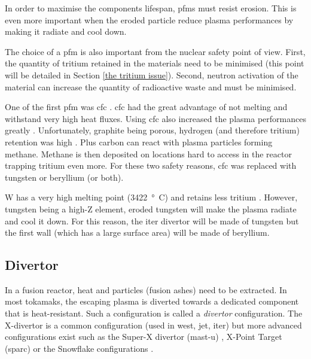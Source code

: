 In order to maximise the components lifespan, \glspl{pfm} must resist erosion.
This is even more important when the eroded particle reduce \gls{plasma} performances by making it radiate and cool down.

The choice of a \gls{pfm} is also important from the nuclear safety point of view.
First, the quantity of tritium retained in the materials need to be minimised (this point will be detailed in Section \ref{the tritium issue}).
Second, neutron activation of the material can increase the quantity of radioactive waste and must be minimised.

One of the first \gls{pfm} was \gls{cfc} .
\gls{cfc} had the great advantage of not melting and withstand very high heat fluxes.
Using \gls{cfc} also increased the \gls{plasma} performances greatly .
Unfortunately, graphite being porous, hydrogen (and therefore tritium) retention was high .
Plus carbon can react with \gls{plasma} particles forming methane.
Methane is then deposited on locations hard to access in the reactor \gls{trapping} tritium even more.
For these two safety reasons, \gls{cfc} was replaced with tungsten or beryllium (or both).

\Gls{W} has a very high melting point (\SI{3422}{°C}) and retains less tritium .
However, tungsten being a high-Z element, eroded tungsten will make the \gls{plasma} radiate and cool it down.
For this reason, the \acrshort{iter} divertor will be made of tungsten but the first wall (which has a large surface area) will be made of beryllium.

\subsection{Divertor}

In a fusion reactor, heat and particles (fusion ashes) need to be extracted.
In most \glspl{tokamak}, the escaping \gls{plasma} is diverted towards a dedicated component that is heat-resistant.
Such a configuration is called a \emph{\gls{divertor}} configuration.
The X-divertor is a common configuration (used in \acrshort{west}, \acrshort{jet}, \acrshort{iter}) but more advanced configurations exist such as the Super-X \gls{divertor} (\acrshort{mast-u}) , X-Point Target (\acrshort{sparc})  or the Snowflake configurations .

